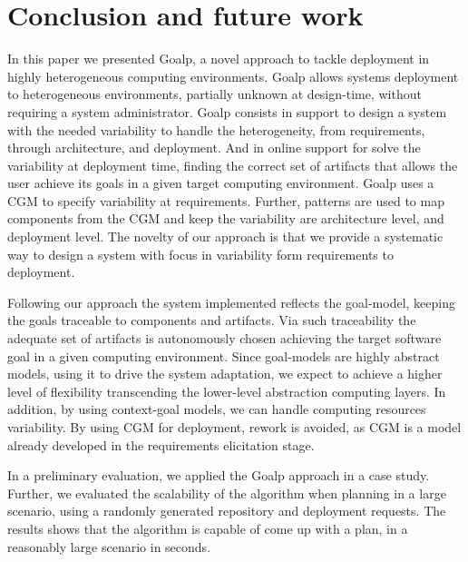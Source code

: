 \section{Conclusion and future work}
\label{sec:conclusion}

In this paper we presented Goalp, a novel approach to tackle deployment in highly heterogeneous computing environments.
Goalp allows systems deployment to heterogeneous environments, partially unknown at design-time, without requiring a system administrator.
Goalp consists in support to design a system with the needed variability to handle the heterogeneity, from requirements, through architecture, and deployment.
And in online support for solve the variability at deployment time, finding the correct set of artifacts that allows the user achieve its goals in a given target computing environment. Goalp uses a CGM to specify variability at requirements. Further, patterns are used to map components from the CGM and keep the variability are architecture level, and deployment level. The novelty of our approach is that we provide a systematic way to design a system with focus in variability form requirements to deployment.

Following our approach the system implemented reflects the goal-model, keeping the goals traceable to components and artifacts. Via such traceability the adequate set of artifacts is autonomously chosen achieving the target software goal in a given computing environment. Since goal-models are highly abstract models, using it to drive the system adaptation, we expect to achieve a higher level of flexibility transcending the lower-level abstraction computing layers. In addition, by using context-goal models, we can handle computing resources variability. By using CGM for deployment, rework is avoided, as CGM is a model already developed in the requirements elicitation stage.

In a preliminary evaluation, we applied the Goalp approach in a case study. Further, we evaluated the scalability of the algorithm when planning in a large scenario, using a randomly generated repository and deployment requests. The results shows that the algorithm is capable of come up with a plan, in a reasonably large scenario in seconds.


